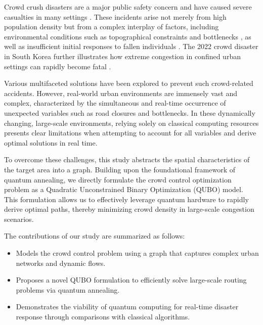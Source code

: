 \documentclass[twocolumn,a4paper]{article} %
\begin{document}
Crowd crush disasters are a major public safety concern and have caused severe casualties in many settings \cite{fruin1993causes}. These incidents arise not merely from high population density but from a complex interplay of factors, including environmental conditions such as topographical constraints and bottlenecks \cite{helbing2007dynamics}, as well as insufficient initial responses to fallen individuals \cite{soomaroo2012disasters}. The 2022 crowd disaster in South Korea further illustrates how extreme congestion in confined urban settings can rapidly become fatal \cite{chang2024crowd}.

Various multifaceted solutions have been explored to prevent such crowd-related accidents\cite{Nishinari2024}. However, real-world urban environments are immensely vast and complex, characterized by the simultaneous and real-time occurrence of unexpected variables such as road closures and bottlenecks. In these dynamically changing, large-scale environments, relying solely on classical computing resources presents clear limitations when attempting to account for all variables and derive optimal solutions in real time.

To overcome these challenges, this study abstracts the spatial characteristics of the target area into a graph. Building upon the foundational framework of quantum annealing\cite{Kadowaki1998}, we directly formulate the crowd control optimization problem as a Quadratic Unconstrained Binary Optimization (QUBO) model. This formulation allows us to effectively leverage quantum hardware to rapidly derive optimal paths, thereby minimizing crowd density in large-scale congestion scenarios.

The contributions of our study are summarized as follows:
\begin{itemize}
    \setlength{\itemsep}{0pt}       %
    \setlength{\parsep}{0pt}        %
    \setlength{\parskip}{0pt}
    
    \item[(1)] Models the crowd control problem using a graph that captures complex urban networks and dynamic flows.
    \item[(2)] Proposes a novel QUBO formulation to efficiently solve large-scale routing problems via quantum annealing.
    \item[(3)] Demonstrates the viability of quantum computing for real-time disaster response through comparisons with classical algorithms.
\end{itemize}
\end{document}

